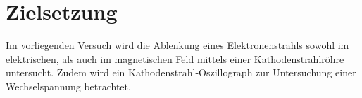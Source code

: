 \section{Zielsetzung}
\label{sec:Zielsetzung}
Im vorliegenden Versuch wird die Ablenkung eines Elektronenstrahls sowohl im elektrischen, als auch im magnetischen Feld mittels einer Kathodenstrahlröhre untersucht. Zudem wird ein Kathodenstrahl-Oszillograph zur Untersuchung einer Wechselspannung betrachtet.
